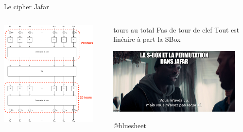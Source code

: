 \begin{frame}{Le cipher Jafar}
  \begin{columns}[c]
             \begin{center}                  
                \includegraphics[width=0.9\textwidth]{img/crypto/jafar/jafar-scheme.png}
            \end{center}
           \begin{outline}
                 tours au total
                \pause
                \1 Pas de tour de clef
                \pause
                \1 Tout est linéaire à part la SBox
                \pause
                \begin{center}                  
                 \includegraphics[width=0.9\textwidth]{img/meme/jafar-meme.png}
                \end{center}
                \hfill \tiny{@bluesheet}
           \end{outline}
    \end{columns}
\end{frame}

